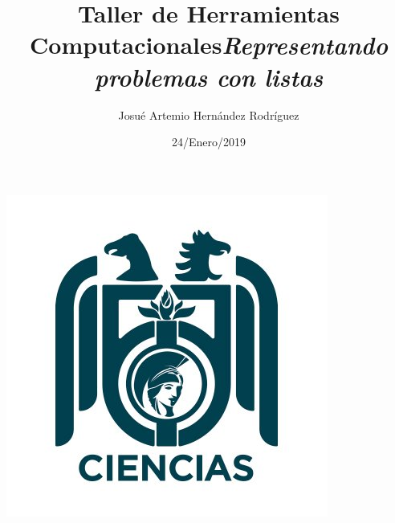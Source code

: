 \label{key}\documentclass[letterpaper, 12pt,oneside]{article}
\title{\Huge Taller de Herramientas Computacionales}
\author{Josué Artemio Hernández Rodríguez}
\date{24/Enero/2019}
\begin{document}
	\maketitle
	\begin{center}
		\includegraphics[scale=0.7]{3.jpg}
	\end{center}

	\newpage
	
	\title{\huge \textit{Representando problemas con listas }}\\
	
\end{document}
